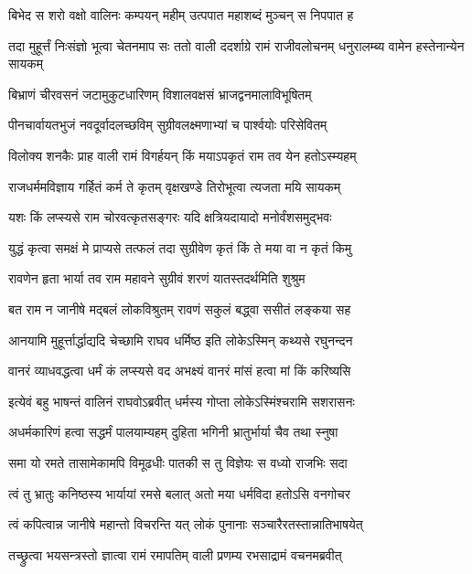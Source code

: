 \twolineshloka
{बिभेद स शरो वक्षो वालिनः कम्पयन् महीम्}
{उत्पपात महाशब्दं मुञ्चन् स निपपात ह} %

\threelineshloka
{तदा मुहूर्त्तं निःसंज्ञो भूत्वा चेतनमाप सः}
{ततो वाली ददर्शाग्रे रामं राजीवलोचनम्}
{धनुरालम्ब्य वामेन हस्तेनान्येन सायकम्} %

\twolineshloka
{बिभ्राणं चीरवसनं जटामुकुटधारिणम्}
{विशालवक्षसं भ्राजद्वनमालाविभूषितम्} %

\twolineshloka
{पीनचार्वायतभुजं नवदूर्वादलच्छविम्}
{सुग्रीवलक्ष्मणाभ्यां च पार्श्वयोः परिसेवितम्} %

\twolineshloka
{विलोक्य शनकैः प्राह वाली रामं विगर्हयन्}
{किं मयाऽपकृतं राम तव येन हतोऽस्म्यहम्} %

\twolineshloka
{राजधर्ममविज्ञाय गर्हितं कर्म ते कृतम्}
{वृक्षखण्डे तिरोभूत्वा त्यजता मयि सायकम्} %

\twolineshloka
{यशः किं लप्स्यसे राम चोरवत्कृतसङ्गरः}
{यदि क्षत्रियदायादो मनोर्वंशसमुद्भवः} %

\twolineshloka
{युद्धं कृत्वा समक्षं मे प्राप्यसे तत्फलं तदा}
{सुग्रीवेण कृतं किं ते मया वा न कृतं किमु} %

\twolineshloka
{रावणेन हृता भार्या तव राम महावने}
{सुग्रीवं शरणं यातस्तदर्थमिति शुश्रुम} %

\twolineshloka
{बत राम न जानीषे मद्बलं लोकविश्रुतम्}
{रावणं सकुलं बद्ध्वा ससीतं लङ्कया सह} %

\twolineshloka
{आनयामि मुहूर्त्तार्द्धाद्यदि चेच्छामि राघव}
{धर्मिष्ठ इति लोकेऽस्मिन् कथ्यसे रघुनन्दन} %

\twolineshloka
{वानरं व्याधवद्धत्वा धर्मं कं लप्स्यसे वद}
{अभक्ष्यं वानरं मांसं हत्वा मां किं करिष्यसि} %

\twolineshloka
{इत्येवं बहु भाषन्तं वालिनं राघवोऽब्रवीत्}
{धर्मस्य गोप्ता लोकेऽस्मिंश्चरामि सशरासनः} %

\twolineshloka
{अधर्मकारिणं हत्वा सद्धर्मं पालयाम्यहम्}
{दुहिता भगिनी भ्रातुर्भार्या चैव तथा स्नुषा} %

\twolineshloka
{समा यो रमते तासामेकामपि विमूढधीः}
{पातकी स तु विज्ञेयः स वध्यो राजभिः सदा} %

\twolineshloka
{त्वं तु भ्रातुः कनिष्ठस्य भार्यायां रमसे बलात्}
{अतो मया धर्मविदा हतोऽसि वनगोचर} %

\twolineshloka
{त्वं कपित्वान्न जानीषे महान्तो विचरन्ति यत्}
{लोकं पुनानाः सञ्चारैरतस्तान्नातिभाषयेत्} %

\twolineshloka
{तच्छ्रुत्वा भयसन्त्रस्तो ज्ञात्वा रामं रमापतिम्}
{वाली प्रणम्य रभसाद्रामं वचनमब्रवीत्} %

